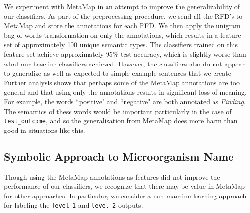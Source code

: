 \documentclass[11pt]{article}
\begin{document}
\iffalse
For example, when MetaMap is run on the following string: \begin{spverbatim}
"Rhinovirus or Enterovirus detected by multiplex NAT. Adenovirus detected by multiplex NAT. Multiplex NAT is capable of detecting Influenza A and B, Respiratory Syncytial Virus, Parainfluenza 1, 2, 3, and 4, Rhinovirus, Enterovirus, Adenovirus, Coronaviruses HKU1, NL63, OC43, 229E, hMetapneumovirus, Bocavirus, C. pneumoniae, L. pneumophila, and M. pneumoniae. MULTIPLE INFECTION DETECTED"
\end{spverbatim}
\medskip
The organisms ``Coryza Viruses", ``Respiratory syncytial virus", ``Bocavirus", ``Adenoviruses", ``Mycoplasma pneumoniae", ``Legionella pneumophila", ``Enterovirus", ``Genus: Coronavirus", and ``Rhinovirus" are detected by MetaMap.
\fi

We experiment with MetaMap in an attempt to improve the generalizability of our classifiers. As part of the preprocessing procedure, we send all the RFD's to MetaMap and store the annotations for each RFD. We then apply the unigram bag-of-words transformation on only the annotations, which results in a feature set of approximately 100 unique semantic types. The classifiers trained on this feature set achieve approximately 95\% test accuracy, which is slightly worse than what our baseline classifiers achieved. However, the classifiers also do not appear to generalize as well as expected to simple example sentences that we create. Further analysis shows that perhaps some of the MetaMap annotations are too general and that using only the annotations results in significant loss of meaning. For example, the words ``positive" and ``negative" are both annotated as \textit{Finding}. The semantics of these words would be important particularly in the case of \verb|test_outcome|, and so the generalization from MetaMap does more harm than good in situations like this.


\subsection{Symbolic Approach to Microorganism Name} \label{symbolic approach to microorganism name}

Though using the MetaMap annotations as features did not improve the performance of our classifiers, we recognize that there may be value in MetaMap for other approaches. In particular, we consider a non-machine learning approach for labeling the \verb|level_1| and \verb|level_2| outputs.
\\
\end{document}
